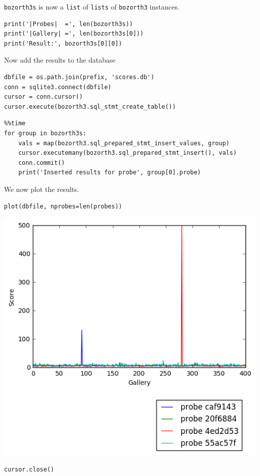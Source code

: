 \texttt{bozorth3s} is now a \texttt{list} of \texttt{lists} of
\texttt{bozorth3} instances.

\begin{lstlisting}
print('|Probes|  =', len(bozorth3s))
print('|Gallery| =', len(bozorth3s[0]))
print('Result:', bozorth3s[0][0])
\end{lstlisting}

Now add the results to the database

\begin{lstlisting}
dbfile = os.path.join(prefix, 'scores.db')
conn = sqlite3.connect(dbfile)
cursor = conn.cursor()
cursor.execute(bozorth3.sql_stmt_create_table())
\end{lstlisting}

\begin{lstlisting}
%%time
for group in bozorth3s:
    vals = map(bozorth3.sql_prepared_stmt_insert_values, group)
    cursor.executemany(bozorth3.sql_prepared_stmt_insert(), vals)
    conn.commit()
    print('Inserted results for probe', group[0].probe)
\end{lstlisting}

We now plot the results.

\begin{lstlisting}
plot(dbfile, nprobes=len(probes))
\end{lstlisting}

\includegraphics{fingerprint_matching_files/fingerprint_matching_74_0.png}

\begin{lstlisting}
cursor.close()
\end{lstlisting}

